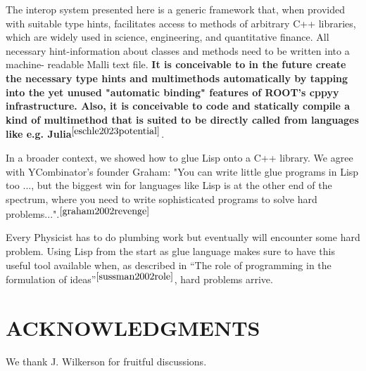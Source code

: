 \documentclass[twocolumn]{article}
\begin{document}
The interop system presented here is a generic framework that, when provided with suitable type hints, facilitates access to methods of arbitrary C++ libraries, which are widely used in science, engineering, and quantitative finance. All necessary hint-information about classes and methods need to be written into a machine- readable Malli text file. \textbf{It is conceivable to in the future create the necessary type hints and multimethods automatically by tapping into the yet unused "automatic binding" features of ROOT's cppyy infrastructure. Also, it is conceivable to code and statically compile a kind of multimethod that is suited to be directly called from languages like e.g. Julia}$^{\cite{eschle2023potential}}$.

In a broader context, we showed how to glue Lisp onto a C++ library. We agree with YCombinator's founder Graham: "You can write little glue programs in Lisp too ..., but the biggest win for languages like Lisp is at the other end of the spectrum, where you need to write sophisticated programs to solve hard problems...".$^{\cite{graham2002revenge}}$

Every Physicist has to do plumbing work but eventually will encounter some  hard problem. Using Lisp from the start as glue language makes sure to have this useful tool available when, as described in “The role of programming in the formulation of ideas”$^{\cite{sussman2002role}}$, hard problems arrive.

\section{ACKNOWLEDGMENTS}
We thank J. Wilkerson for fruitful discussions.




\end{document}
